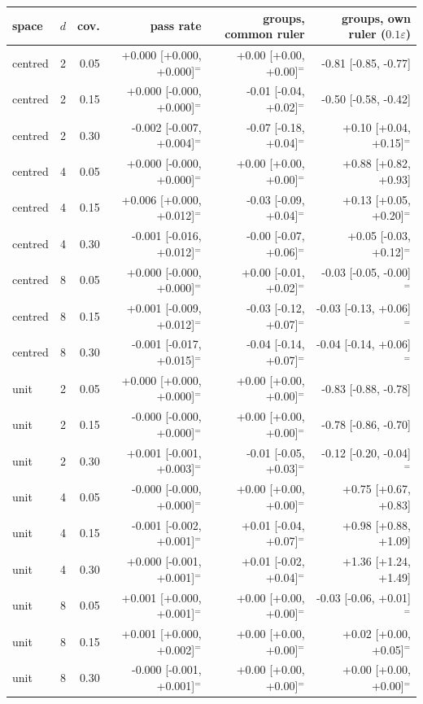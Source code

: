 \begin{tabular}{lrrrrr}
\toprule
space & $d$ & cov. & pass rate & groups, common ruler & groups, own ruler ($0.1\varepsilon$) \\
\midrule
centred & 2 & 0.05 & +0.000 [+0.000, +0.000]$^{=}$ & +0.00 [+0.00, +0.00]$^{=}$ & -0.81 [-0.85, -0.77] \\
centred & 2 & 0.15 & +0.000 [-0.000, +0.000]$^{=}$ & -0.01 [-0.04, +0.02]$^{=}$ & -0.50 [-0.58, -0.42] \\
centred & 2 & 0.30 & -0.002 [-0.007, +0.004]$^{=}$ & -0.07 [-0.18, +0.04]$^{=}$ & +0.10 [+0.04, +0.15]$^{=}$ \\
centred & 4 & 0.05 & +0.000 [-0.000, +0.000]$^{=}$ & +0.00 [+0.00, +0.00]$^{=}$ & +0.88 [+0.82, +0.93] \\
centred & 4 & 0.15 & +0.006 [+0.000, +0.012]$^{=}$ & -0.03 [-0.09, +0.04]$^{=}$ & +0.13 [+0.05, +0.20]$^{=}$ \\
centred & 4 & 0.30 & -0.001 [-0.016, +0.012]$^{=}$ & -0.00 [-0.07, +0.06]$^{=}$ & +0.05 [-0.03, +0.12]$^{=}$ \\
centred & 8 & 0.05 & +0.000 [-0.000, +0.000]$^{=}$ & +0.00 [-0.01, +0.02]$^{=}$ & -0.03 [-0.05, -0.00]$^{=}$ \\
centred & 8 & 0.15 & +0.001 [-0.009, +0.012]$^{=}$ & -0.03 [-0.12, +0.07]$^{=}$ & -0.03 [-0.13, +0.06]$^{=}$ \\
centred & 8 & 0.30 & -0.001 [-0.017, +0.015]$^{=}$ & -0.04 [-0.14, +0.07]$^{=}$ & -0.04 [-0.14, +0.06]$^{=}$ \\
unit & 2 & 0.05 & +0.000 [+0.000, +0.000]$^{=}$ & +0.00 [+0.00, +0.00]$^{=}$ & -0.83 [-0.88, -0.78] \\
unit & 2 & 0.15 & -0.000 [-0.000, +0.000]$^{=}$ & +0.00 [+0.00, +0.00]$^{=}$ & -0.78 [-0.86, -0.70] \\
unit & 2 & 0.30 & +0.001 [-0.001, +0.003]$^{=}$ & -0.01 [-0.05, +0.03]$^{=}$ & -0.12 [-0.20, -0.04]$^{=}$ \\
unit & 4 & 0.05 & -0.000 [-0.000, +0.000]$^{=}$ & +0.00 [+0.00, +0.00]$^{=}$ & +0.75 [+0.67, +0.83] \\
unit & 4 & 0.15 & -0.001 [-0.002, +0.001]$^{=}$ & +0.01 [-0.04, +0.07]$^{=}$ & +0.98 [+0.88, +1.09] \\
unit & 4 & 0.30 & +0.000 [-0.001, +0.001]$^{=}$ & +0.01 [-0.02, +0.04]$^{=}$ & +1.36 [+1.24, +1.49] \\
unit & 8 & 0.05 & +0.001 [+0.000, +0.001]$^{=}$ & +0.00 [+0.00, +0.00]$^{=}$ & -0.03 [-0.06, +0.01]$^{=}$ \\
unit & 8 & 0.15 & +0.001 [+0.000, +0.002]$^{=}$ & +0.00 [+0.00, +0.00]$^{=}$ & +0.02 [+0.00, +0.05]$^{=}$ \\
unit & 8 & 0.30 & -0.000 [-0.001, +0.001]$^{=}$ & +0.00 [+0.00, +0.00]$^{=}$ & +0.00 [+0.00, +0.00]$^{=}$ \\
\bottomrule
\end{tabular}
